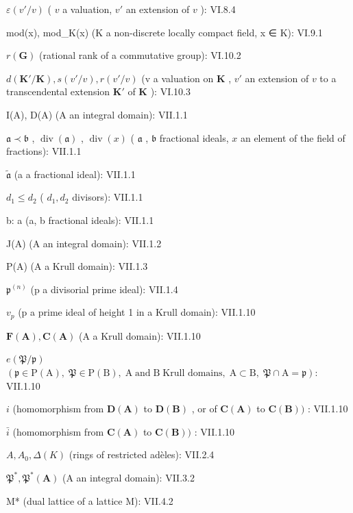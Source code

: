\(\varepsilon(v'/v)\) ( \(v\) a valuation, \(v'\) an extension of \(v\) ): VI.8.4

mod(x), mod\_K(x) (K a non-discrete locally compact field, x ∈ K): VI.9.1

\(r(\mathbf{G})\) (rational rank of a commutative group): VI.10.2

\(d(\mathbf{K}' / \mathbf{K}), s(v' / v), r(v' / v)\) (v a valuation on \(\mathbf{K}\) , \(v'\) an extension of \(v\) to a transcendental extension \(\mathbf{K}'\) of \(\mathbf{K}\) ): VI.10.3

I(A), D(A) (A an integral domain): VII.1.1

\(\mathfrak{a} \prec \mathfrak{b}\) , \(\operatorname{div}(\mathfrak{a})\) , \(\operatorname{div}(x)\) ( \(\mathfrak{a}\) , \(\mathfrak{b}\) fractional ideals, \(x\) an element of the field of fractions): VII.1.1

\(\tilde{\mathfrak{a}}\) (a a fractional ideal): VII.1.1

\(d_{1} \leqslant d_{2}\) ( \(d_{1}, d_{2}\) divisors): VII.1.1

b: a (a, b fractional ideals): VII.1.1

J(A) (A an integral domain): VII.1.2

P(A) (A a Krull domain): VII.1.3

\(\mathfrak{p}^{(n)}\) (p a divisorial prime ideal): VII.1.4

\(v_{p}\) (p a prime ideal of height 1 in a Krull domain): VII.1.10

\(\mathbf{F}(\mathbf{A}), \mathbf{C}(\mathbf{A})\) (A a Krull domain): VII.1.10

\(e(\mathfrak{P}/\mathfrak{p})\) \((\mathfrak{p}\in\mathrm{P}(\mathrm{A}),\;\mathfrak{P}\in\mathrm{P}(\mathrm{B}),\;\mathrm{A}\;\text{and}\;\mathrm{B}\;\text{Krull domains},\;\mathrm{A}\subset\mathrm{B},\;\mathfrak{P}\cap\mathrm{A}=\mathfrak{p}):\) VII.1.10

\(i\) (homomorphism from \(\mathbf{D}(\mathbf{A})\) to \(\mathbf{D}(\mathbf{B})\) , or of \(\mathbf{C}(\mathbf{A})\) to \(\mathbf{C}(\mathbf{B}))\) : VII.1.10

\(\bar{i}\) (homomorphism from \(\mathbf{C}(\mathbf{A})\) to \(\mathbf{C}(\mathbf{B}))\) : VII.1.10

\(A, A_{0}, \Delta(K)\) (rings of restricted adèles): VII.2.4

\(\mathfrak{P}^*, \mathfrak{P}^*(\mathbf{A})\) (A an integral domain): VII.3.2

M* (dual lattice of a lattice M): VII.4.2

